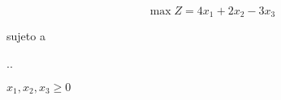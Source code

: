 \documentclass[../main.tex]{subfiles}
\begin{document}


\begin{questions}
\question %

\[\max Z  = 4x_1 + 2x_2 - 3x_3    \]

{\centering
sujeto a 

\sysdelim..%
%

\vspace{3mm}
$x_1, x_2, x_3\geq 0$
\par}





\end{questions}
\end{document}
